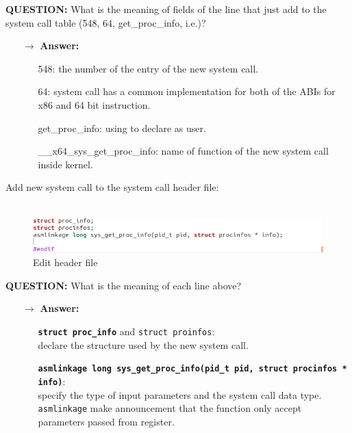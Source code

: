 \documentclass[a4paper]{article}
\begin{document}
\begin{mdframed}[hidealllines=true,backgroundcolor=blue!10]
\textbf{QUESTION:} What is the meaning of fields of the line that just add to the system call table (548, 64, get\_proc\_info, i.e.)? 
\begin{itemize}
\item[$\rightarrow$] \textbf{Answer:} 
\begin{itemize}
\item[\textbullet] 548: the number of the entry of the new system call.
\item[\textbullet] 64: system call has a common implementation for both of the ABIs for x86 and 64 bit instruction.
\item[\textbullet] get\_proc\_info: using to declare as user.
\item[\textbullet] \_\_x64\_sys\_get\_proc\_info: name of function of the new system call inside kernel.
\end{itemize} 
\end{itemize}
\end{mdframed}
Add new system call to the system call header file:\\
\noindent{}\\
\begin{figure}[h!]
\begin{center}
\includegraphics[width=14cm]{8.png}
\caption{Edit header file}
\end{center}
\end{figure}
\begin{mdframed}[hidealllines=true,backgroundcolor=blue!10]
\textbf{QUESTION:} What is the meaning of each line above? 
\begin{itemize}
\item[$\rightarrow$] \textbf{Answer:}
\begin{itemize}
\item[\textbullet]\texttt{\textbf{struct proc\_info}} and \texttt{struct proinfos}:\\
declare the structure used by the new system call.
\item[\textbullet]\texttt{\textbf{asmlinkage long sys\_get\_proc\_info(pid\_t pid, struct procinfos * info)}}:\\
specify the type of input parameters and the system call data type. \texttt{asmlinkage} make announcement that the function only accept parameters passed from register.
\end{itemize}
\end{itemize}
\end{mdframed}
\end{document}
